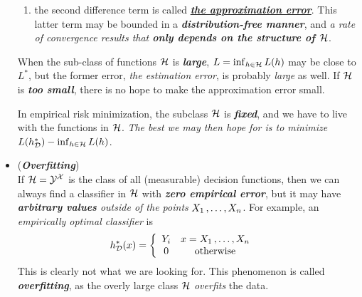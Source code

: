 \documentclass[11pt]{article}
\begin{document}
\begin{itemize}
\begin{remark}
\begin{enumerate}
\item the second difference term is called \underline{\emph{\textbf{the approximation error}}}. This latter term may be bounded in a \emph{\textbf{distribution-free manner}}, and \emph{a rate of convergence results that \textbf{only depends on the structure of ${\mathcal H}$}}.
\end{enumerate}

When the sub-class of functions ${\mathcal H}$ is \emph{\textbf{large}}, $L = \inf_{h \in {\mathcal H}}L(h)$ may be close to $L^{*}$, but the former error, \emph{the estimation error}, is probably \emph{large} as well.  If ${\mathcal H}$ is \emph{\textbf{too small}}, there is no hope to make the approximation error small.

 In empirical risk minimization, the subclass ${\mathcal H}$ is \emph{\textbf{fixed}}, and we have to live with the functions in ${\mathcal H}$. \emph{The best we may then
hope for is to minimize $L(h_{{\mathcal D}}^{*}) - \inf_{h \in {\mathcal H}}L(h)$}. 
\end{remark}

\item \begin{remark} (\emph{\textbf{Overfitting}})\\
If ${\mathcal H} = {\mathcal Y}^{{\mathcal X}}$ is the class of all (measurable) decision functions, then we can always find a classifier in ${\mathcal H}$ with \emph{\textbf{zero empirical error}}, but it may have \emph{\textbf{arbitrary values} outside of the points} $X_1 \,{,}\ldots{,}\, X_n$. For example, an \emph{empirically optimal classifier} is
\begin{align*}
h_{{\mathcal D}}^{*}(x) &= \left\{ \begin{array}{cc}
Y_i & x = X_1 \,{,}\ldots{,}\, X_n\\
0 & \text{otherwise}
\end{array}
\right.
\end{align*} This is clearly not what we are looking for. This phenomenon is called \emph{\textbf{overfitting}}, as the overly large class ${\mathcal H}$ \emph{overfits} the data. 
\end{remark}
\end{itemize}
\end{document}
